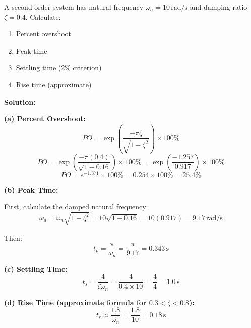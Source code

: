 \begin{example}
\label{ex:specs}
A second-order system has natural frequency $\omega_n = 10\,\text{rad/s}$ and damping ratio $\zeta = 0.4$. Calculate:
\begin{enumerate}[label=(\alph*)]
    \item Percent overshoot
    \item Peak time
    \item Settling time (2\% criterion)
    \item Rise time (approximate)
\end{enumerate}
\end{example}

\textbf{Solution:}

\textbf{(a) Percent Overshoot:}
\begin{equation}
PO = \exp\left(\frac{-\pi\zeta}{\sqrt{1-\zeta^2}}\right) \times 100\%
\end{equation}
\begin{equation}
PO = \exp\left(\frac{-\pi(0.4)}{\sqrt{1-0.16}}\right) \times 100\% = \exp\left(\frac{-1.257}{0.917}\right) \times 100\%
\end{equation}
\begin{equation}
PO = e^{-1.371} \times 100\% = 0.254 \times 100\% = \boxed{25.4\%}
\end{equation}

\textbf{(b) Peak Time:}

First, calculate the damped natural frequency:
\begin{equation}
\omega_d = \omega_n\sqrt{1-\zeta^2} = 10\sqrt{1-0.16} = 10(0.917) = 9.17\,\text{rad/s}
\end{equation}

Then:
\begin{equation}
t_p = \frac{\pi}{\omega_d} = \frac{\pi}{9.17} = \boxed{0.343\,\text{s}}
\end{equation}

\textbf{(c) Settling Time:}
\begin{equation}
t_s = \frac{4}{\zeta\omega_n} = \frac{4}{0.4 \times 10} = \frac{4}{4} = \boxed{1.0\,\text{s}}
\end{equation}

\textbf{(d) Rise Time (approximate formula for $0.3 < \zeta < 0.8$):}
\begin{equation}
t_r \approx \frac{1.8}{\omega_n} = \frac{1.8}{10} = \boxed{0.18\,\text{s}}
\end{equation}

